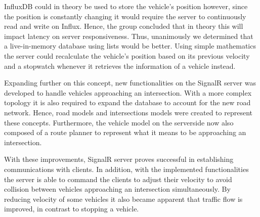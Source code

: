 InfluxDB could in theory be used to store the vehicle's position however, since the position is constantly changing it would require the server to continuously read and write on Influx. Hence, the group concluded that in theory this will impact latency on server responsiveness. Thus, unanimously we determined that a live-in-memory database using lists would be better. Using simple mathematics the server could recalculate the vehicle's position based on its previous velocity and a stopwatch whenever it retrieves the information of a vehicle instead.

Expanding further on this concept, new functionalities on the SignalR server was developed to handle vehicles approaching an intersection. With a more complex topology it is also required to expand the database to account for the new road network. Hence, road models and intersections models were created to represent these concepts. Furthermore, the vehicle model on the serverside now also composed of a route planner to represent what it means to be approaching an intersection.

With these improvements, SignalR server proves successful in establishing communications with clients. In addition, with the implemented functionalities the server is able to command the clients to adjust their velocity to avoid collision between vehicles approaching an intersection simultaneously. By reducing velocity of some vehicles it also became apparent that traffic flow is improved, in contrast to stopping a vehicle.

